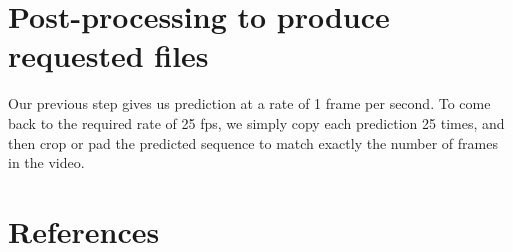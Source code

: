 \documentclass[runningheads,a4paper]{llncs}
\begin{document}
\section{Post-processing to produce requested files}

Our previous step gives us prediction at a rate of 1 frame per second. To come
back to the required rate of 25 fps, we simply copy each prediction 25 times, and
then crop or pad the predicted sequence to match exactly the number of frames in
the video.


\renewcommand*{\refname}{\vspace*{-1.8em}}
\section{References}


\end{document}
